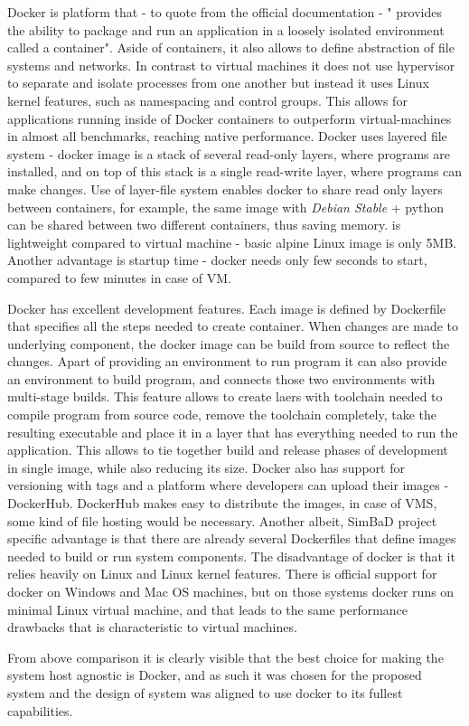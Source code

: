 Docker is platform that - to quote from the official documentation - " provides the ability to package and run an application in a loosely isolated environment called a container". Aside of containers, it also allows to define abstraction of file systems and networks.  In contrast to virtual machines it does not use hypervisor to separate and isolate processes from one another but instead it uses Linux kernel features, such as namespacing and control groups. This allows for applications running inside of Docker containers to outperform virtual-machines in almost all benchmarks, reaching native performance. Docker uses layered file system - docker image is a stack of several read-only layers, where programs are installed, and on top of this stack is a single read-write layer, where programs can make changes. Use of layer-file system enables docker to share read only layers between containers, for example, the same image with \textit{Debian Stable} + python can be shared between two different containers, thus saving memory.  is lightweight compared to virtual machine - basic alpine Linux image is only 5MB. Another advantage is startup time - docker needs only few seconds to start, compared to few minutes in case of VM. 

Docker has excellent development features. Each image is defined by Dockerfile that specifies all the steps needed to create container. When changes are made to underlying component, the docker image can be build from source to reflect the changes. Apart of providing an environment to run program it can also provide an environment to build program, and connects those two environments with multi-stage builds. This feature allows to create laers with toolchain needed to compile program from source code, remove the toolchain completely, take the resulting executable and place it in a layer that has everything needed to run the application. This allows to tie together build and release phases of development in single image, while also reducing its size. Docker also has support for versioning with tags and a platform where developers can upload their images - DockerHub. DockerHub makes easy to distribute the images, in case of VMS, some kind of file hosting would be necessary. Another albeit, SimBaD project specific advantage is that there are already several Dockerfiles that define images needed to build or run system components.
The disadvantage of docker is that it relies heavily on Linux and Linux kernel features. There is official support for docker on Windows and Mac OS machines, but on those systems docker runs on minimal Linux virtual machine, and that leads to the same performance drawbacks that is characteristic to virtual machines. 

From above comparison it is clearly visible that the best choice for making the system host agnostic is Docker, and as such it was chosen for the proposed system and the design of system was aligned to use docker to its fullest capabilities.

